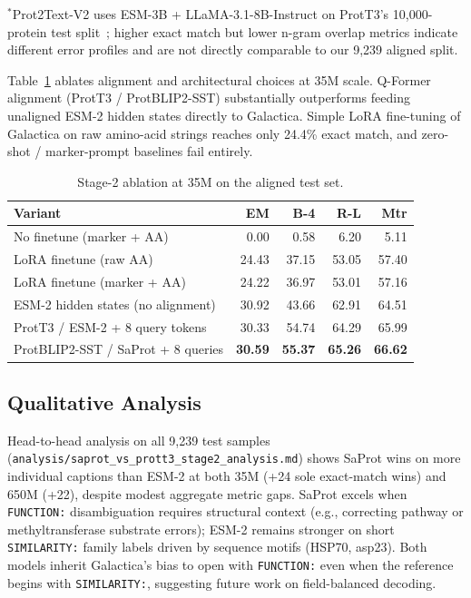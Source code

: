 \documentclass[conference]{IEEEtran}
\newcommand{\best}[1]{\textbf{#1}}
\begin{document}
\noindent$^{*}$Prot2Text-V2 uses ESM-3B + LLaMA-3.1-8B-Instruct on ProtT3's 10{,}000-protein test split~\cite{fei2025prot2text}; higher exact match but lower n-gram overlap metrics indicate different error profiles and are not directly comparable to our 9{,}239 aligned split.

Table~\ref{tab:stage2-ablation} ablates alignment and architectural choices at 35M scale.
Q-Former alignment (ProtT3 / ProtBLIP2-SST) substantially outperforms feeding unaligned ESM-2 hidden states directly to Galactica.
Simple LoRA fine-tuning of Galactica on raw amino-acid strings reaches only 24.4\% exact match, and zero-shot / marker-prompt baselines fail entirely.

\begin{table}[t]
  \caption{Stage-2 ablation at 35M on the aligned test set.}
  \label{tab:stage2-ablation}
  \centering
  \small
  \begin{tabular}{l r r r r}
    \toprule
    Variant & EM & B-4 & R-L & Mtr \\
    \midrule
    No finetune (marker + AA) & 0.00 & 0.58 & 6.20 & 5.11 \\
    LoRA finetune (raw AA) & 24.43 & 37.15 & 53.05 & 57.40 \\
    LoRA finetune (marker + AA) & 24.22 & 36.97 & 53.01 & 57.16 \\
    ESM-2 hidden states (no alignment) & 30.92 & 43.66 & 62.91 & 64.51 \\
    ProtT3 / ESM-2 + 8 query tokens & 30.33 & 54.74 & 64.29 & 65.99 \\
    ProtBLIP2-SST / SaProt + 8 queries & \best{30.59} & \best{55.37} & \best{65.26} & \best{66.62} \\
    \bottomrule
  \end{tabular}
\end{table}

\subsection{Qualitative Analysis}

Head-to-head analysis on all 9{,}239 test samples (\texttt{analysis/saprot\_vs\_prott3\_stage2\_analysis.md}) shows SaProt wins on more individual captions than ESM-2 at both 35M (+24 sole exact-match wins) and 650M (+22), despite modest aggregate metric gaps.
SaProt excels when \texttt{FUNCTION:} disambiguation requires structural context (e.g., correcting pathway or methyltransferase substrate errors); ESM-2 remains stronger on short \texttt{SIMILARITY:} family labels driven by sequence motifs (HSP70, asp23).
Both models inherit Galactica's bias to open with \texttt{FUNCTION:} even when the reference begins with \texttt{SIMILARITY:}, suggesting future work on field-balanced decoding.
\end{document}
